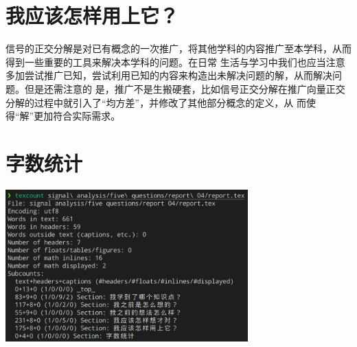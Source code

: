 \documentclass{ctexart}
\begin{document}
    \section{我应该怎样用上它？}

    信号的正交分解是对已有概念的一次推广，将其他学科的内容推广至本学科，从而得到一些重要的工具来解决本学科的问题。在日常
    生活与学习中我们也应当注意多加尝试推广已知，尝试利用已知的内容来构造出未解决问题的解，从而解决问题。但是还需注意的
    是，推广不是生搬硬套，比如信号正交分解在推广向量正交分解的过程中就引入了``均方差''，并修改了其他部分概念的定义，从
    而使得``解''更加符合实际需求。

    \section*{字数统计}

    \begin{center}
        \includegraphics[width=0.7\textwidth]{pics/texcount.png}
    \end{center}
\end{document}
